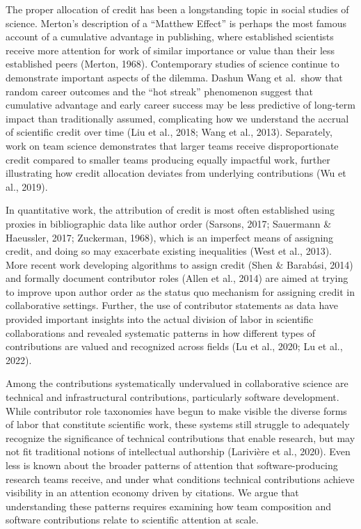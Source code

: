 \documentclass[
  number,
  3p,
  onecolumn]{elsarticle}
\begin{document}
The proper allocation of credit has been a longstanding topic in social
studies of science. Merton's description of a ``Matthew Effect'' is
perhaps the most famous account of a cumulative advantage in publishing,
where established scientists receive more attention for work of similar
importance or value than their less established peers (Merton, 1968).
Contemporary studies of science continue to demonstrate important
aspects of the dilemma. Dashun Wang et al.~show that random career
outcomes and the ``hot streak'' phenomenon suggest that cumulative
advantage and early career success may be less predictive of long-term
impact than traditionally assumed, complicating how we understand the
accrual of scientific credit over time (Liu et al., 2018; Wang et al.,
2013). Separately, work on team science demonstrates that larger teams
receive disproportionate credit compared to smaller teams producing
equally impactful work, further illustrating how credit allocation
deviates from underlying contributions (Wu et al., 2019).

In quantitative work, the attribution of credit is most often
established using proxies in bibliographic data like author order
(Sarsons, 2017; Sauermann \& Haeussler, 2017; Zuckerman, 1968), which is
an imperfect means of assigning credit, and doing so may exacerbate
existing inequalities (West et al., 2013). More recent work developing
algorithms to assign credit (Shen \& Barabási, 2014) and formally
document contributor roles (Allen et al., 2014) are aimed at trying to
improve upon author order as the status quo mechanism for assigning
credit in collaborative settings. Further, the use of contributor
statements as data have provided important insights into the actual
division of labor in scientific collaborations and revealed systematic
patterns in how different types of contributions are valued and
recognized across fields (Lu et al., 2020; Lu et al., 2022).

Among the contributions systematically undervalued in collaborative
science are technical and infrastructural contributions, particularly
software development. While contributor role taxonomies have begun to
make visible the diverse forms of labor that constitute scientific work,
these systems still struggle to adequately recognize the significance of
technical contributions that enable research, but may not fit
traditional notions of intellectual authorship (Larivière et al., 2020).
Even less is known about the broader patterns of attention that
software-producing research teams receive, and under what conditions
technical contributions achieve visibility in an attention economy
driven by citations. We argue that understanding these patterns requires
examining how team composition and software contributions relate to
scientific attention at scale.
\end{document}
